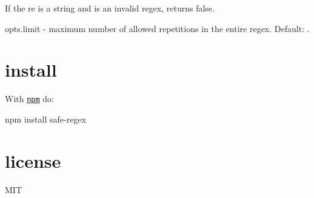 If the {\ttfamily re} is a string and is an invalid regex, returns {\ttfamily false}.


\begin{DoxyItemize}
\item {\ttfamily opts.\+limit} -\/ maximum number of allowed repetitions in the entire regex. Default\+: {}.
\end{DoxyItemize}

\section*{install}

With \href{https://npmjs.org}{\tt npm} do\+:


\begin{DoxyCode}
npm install safe-regex
\end{DoxyCode}


\section*{license}

M\+IT 